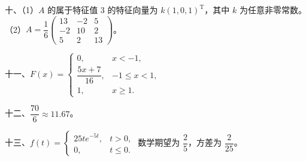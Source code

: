 \documentclass[UTF8,12pt]{ctexart}
\begin{document}
十、（1）\(\displaystyle A\) 的属于特征值 3 的特征向量为 \(\displaystyle k(1,\allowbreak 0,\allowbreak 1)^{\mathrm T}\)，其中 \(\displaystyle k\) 为任意非零常数。（2）\(\displaystyle A=\dfrac{\displaystyle 1}{\displaystyle 6}\begin{pmatrix}13&-2&5\\-2&10&2\\5&2&13\end{pmatrix}\)。


十一、\(\displaystyle F(x)=\begin{cases}0,\allowbreak &x<-1,\allowbreak \\\dfrac{\displaystyle 5x+7}{\displaystyle 16},\allowbreak &-1\leq x<1,\allowbreak \\1,\allowbreak &x\geq1.\end{cases}\)


十二、\(\displaystyle \dfrac{\displaystyle 70}{\displaystyle 6}\approx11.67\)。


十三、\(\displaystyle f(t)=\begin{cases}25te^{-5t},\allowbreak &t>0,\allowbreak \\0,\allowbreak &t\leq0.\end{cases}\) 数学期望为 \(\displaystyle \dfrac{\displaystyle 2}{\displaystyle 5}\)，方差为 \(\displaystyle \dfrac{\displaystyle 2}{\displaystyle 25}\)。
\end{document}
